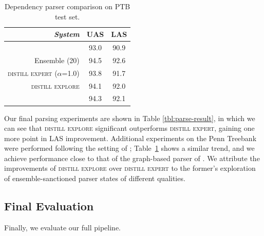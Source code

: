\documentclass[11pt,a4paper]{article}
\begin{document}
\begin{table}[t]
	\centering
	\begin{tabular}{rcc}
		\hline
		\it System & UAS & LAS \\
		\hline
		\newcite{dyer-EtAl:2015:ACL-IJCNLP} & 93.0 & 90.9 \\
		Ensemble (20) & 94.5 & 92.6 \\
		\textsc{distill expert} ($\alpha$=1.0) & 93.8 & 91.7 \\
		\textsc{distill explore} & 94.1 & 92.0 \\
		\hline
		\newcite{kuncoro-16} & 94.3 & 92.1 \\
		\hline
	\end{tabular}
	\caption{Dependency parser comparison on PTB test set.}\label{tbl:parse-result-PTB}
\end{table}

Our final parsing experiments are shown in Table \ref{tbl:parse-result},
in which we can see that \textsc{distill explore} significant
outperforms \textsc{distill expert}, gaining one more point in LAS improvement.
Additional experiments on the Penn Treebank were performed following
the setting of ;
Table~\ref{tbl:parse-result-PTB} shows a similar trend, and we achieve
performance close to that of the graph-based parser of \citet{kuncoro-16}.
We attribute the improvements of \textsc{distill explore} over
\textsc{distill expert} to the former's exploration of
ensemble-sanctioned parser states
of different qualities.

\subsection{Final Evaluation}
Finally, we evaluate our full pipeline.
\end{document}
